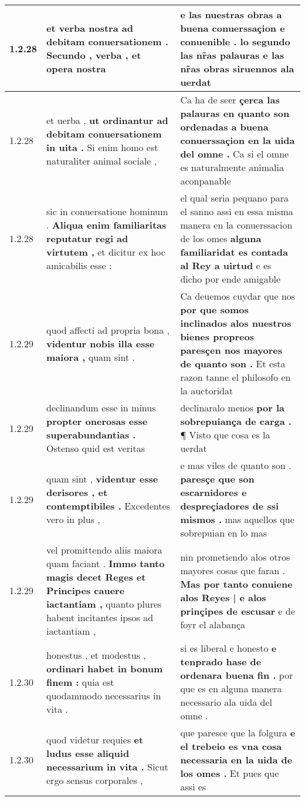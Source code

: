 \begin{tabular}{|p{1cm}|p{6.5cm}|p{6.5cm}|}
1.2.28 & et verba nostra \textbf{ ad debitam conuersationem . } Secundo , verba , et opera nostra & e las nuestras obras a buena conuerssaçion e conuenible . \textbf{ lo segundo las nr̃as palauras } e las nr̃as obras siruennos ala uerdat \\\hline
1.2.28 & et uerba , \textbf{ ut ordinantur ad debitam conuersationem in uita . } Si enim homo est naturaliter animal sociale , & Ca ha de seer \textbf{ çerca las palauras en quanto son ordenadas a buena conuerssaçion en la uida del omne . } Ca si el omne es naturalmente animalia aconpanable \\\hline
1.2.28 & sic in conuersatione hominum . \textbf{ Aliqua enim familiaritas reputatur regi ad virtutem , } et dicitur ex hoc amicabilis esse : & el qual seria pequano para el sanno assi en essa misma manera en la conuerssacion de los omes \textbf{ alguna familiaridat es contada al Rey a uirtud } e es dicho por ende amigable \\\hline
1.2.29 & quod affecti ad propria bona , \textbf{ videntur nobis illa esse maiora , } quam sint . & Ca deuemos cuydar que nos \textbf{ por que somos inclinados alos nuestros bienes propreos paresçen nos mayores de quanto son . } Et esta razon tanne el philosofo en la auctoridat \\\hline
1.2.29 & declinandum esse in minus \textbf{ propter onerosas esse superabundantias . } Ostenso quid est veritas & declinaralo menos \textbf{ por la sobrepuiança de carga . } ¶ Visto que cosa es la uerdat \\\hline
1.2.29 & quam sint , \textbf{ videntur esse derisores , et contemptibiles . } Excedentes vero in plus , & e mas viles de quanto son . \textbf{ paresçe que son escarnidores e despreçiadores de ssi mismos . } mas aquellos que sobrepuian en lo mas \\\hline
1.2.29 & vel promittendo aliis maiora quam faciant . \textbf{ Immo tanto magis decet Reges et Principes cauere iactantiam , } quanto plures habent incitantes ipsos ad iactantiam , & nin prometiendo alos otros mayores cosas que faran . \textbf{ Mas por tanto conuiene alos Reyes | e alos prinçipes de escusar } e de foyr el alabança \\\hline
1.2.30 & honestus , et modestus , \textbf{ ordinari habet in bonum finem : } quia est quodammodo necessarius in vita . & si es liberal e honesto \textbf{ e tenprado hase de ordenara buena fin . } por que es en alguna manera necessario ala uida del omne . \\\hline
1.2.30 & quod videtur requies \textbf{ et ludus esse aliquid necessarium in vita . } Sicut ergo sensus corporales , & que paresce que la folgura \textbf{ e el trebeio es vna cosa necessaria en la uida de los omes . } Et pues que assi es \\\hline

\end{tabular}
